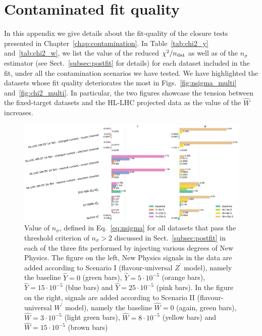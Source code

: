 \documentclass[withindex,glossary]{cam-thesis}
\begin{document}
\chapter{Contaminated fit quality}
\label{app:fit}

In this appendix we give details about the fit-quality of the closure tests presented in Chapter~\ref{chap:contamination}.
In Table~\ref{tab:chi2_y} and~\ref{tab:chi2_w}, we list the value of the reduced $\chi^2/n_{\rm dat}$ 
as well as of the $n_\sigma$ estimator (see Sect.~\ref{subsec:postfit} for details) 
for each dataset included in the fit, under all the contamination scenarios we have tested. 
We have highlighted the datasets whose fit quality deteriorates the most in Figs.~\ref{fig:nsigma_multi} and~\ref{fig:chi2_multi}. 
In particular, the two figures showcase the tension between the fixed-target datasets and the HL-LHC projected data as the value of the $\hat{W}$ increases.

%
\begin{figure}[H]

  \includegraphics[width=0.98\linewidth]{Figures/plot_nsigma_multi.pdf}
  \caption{
    \label{fig:nsigma_multi}
  Value of $n_{\sigma}$, defined in Eq.~\eqref{eq:nsigma}
    for all datasets that pass the threshold criterion of
    $n_{\sigma}>2$ discussed in Sect.~\ref{subsec:postfit} in each of the
    three fits performed by injecting various degrees of New Physics.
    The figure on the left, New Physics signals in the data are added
    according to Scenario I (flavour-universal $Z^{'}$ model), namely the baseline $\hat{Y}=0$ (green bars),
    $\hat{Y}=5\cdot 10^{-5}$ (orange bars), $\hat{Y}=15\cdot 10^{-5}$
    (blue bars) and $\hat{Y}=25\cdot 10^{-5}$ (pink bars).
    In the figure on the right, signals are added according to Scenario II
    (flavour-universal $W^{'}$ model), namely the baseline $\hat{W}=0$ (again, green
    bars), $\hat{W}=3\cdot 10^{-5}$ (light green bars), $\hat{W}=8\cdot 10^{-5}$
    (yellow bars) and $\hat{W}=15\cdot 10^{-5}$ (brown bars)}
\label{fig:Ynsigma}
\end{figure}
\end{document}
